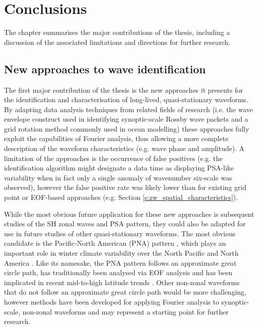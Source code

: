 
\chapter{Conclusions}


\begin{synopsis}

The chapter summarises the major contributions of the thesis, including a discussion of the associated limitations and directions for further research.

\end{synopsis}


\section{New approaches to wave identification}

The first major contribution of the thesis is the new approaches it presents for the identification and characterisation of long-lived, quasi-stationary waveforms. By adapting data analysis techniques from related fields of research (i.e. the wave envelope construct used in identifying synoptic-scale Rossby wave packets and a grid rotation method commonly used in ocean modelling) these approaches fully exploit the capabilities of Fourier analysis, thus allowing a more complete description of the waveform characteristics (e.g. wave phase and amplitude). A limitation of the approaches is the occurrence of false positives (e.g. the identification algorithm might designate a data time as displaying PSA-like variability when in fact only a single anomaly of wavenumber six-scale was observed), however the false positive rate was likely lower than for existing grid point or EOF-based approaches (e.g. Section \ref{s:zw_spatial_characteristics}).

While the most obvious future application for these new approaches is subsequent studies of the SH zonal waves and PSA pattern, they could also be adapted for use in future studies of other quasi-stationary waveforms. The most obvious candidate is the Pacific-North American (PNA) pattern \citep{Wallace1981}, which plays an important role in winter climate variability over the North Pacific and North America \citep[e.g.][]{Notaro2006}. Like its namesake, the PNA pattern follows an approximate great circle path, has traditionally been analysed via EOF analysis and has been implicated in recent mid-to-high latitude trends \citep[e.g.][]{Ding2014,Liu2015}. Other non-zonal waveforms that do not follow an approximate great circle path would be more challenging, however methods have been developed for applying Fourier analysis to synoptic-scale, non-zonal waveforms \citep{Zimin2006,Souders2014} and may represent a starting point for further research. 

